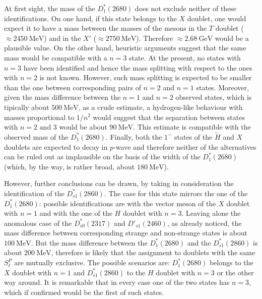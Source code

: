 At first sight, the mass of the $D^*_1(2680)$ does not exclude neither of these identifications. On one hand, if this state belongs to the $X$ doublet, one would expect it to have a mass between the masses of the mesons in the $T$ doublet ($\approx 2450 \ \text{MeV}$) and in the $X'$ ($\approx 2750 \ \text{MeV}$). Therefore $\approx 2.68 \ \text{GeV}$ would be a plausible value. On the other hand, heuristic arguments suggest that the same mass would be compatible with a $n = 3$ state. At the present, no states with $n = 3$ have been identified and hence the mass splitting with respect to the ones with $n = 2$ is not known. However, such mass splitting is expected to be smaller than the one between corresponding pairs of $n = 2$ and $n = 1$ states. Moreover, given the mass difference between the $n = 1$ and $n = 2$ observed states, which is tipically about $500 \ \text{MeV}$, as a crude estimate, a hydrogen-like behaviour with masses proportional to $1/n^2$ would suggest that the separation between states with $n = 2 \text{ and } 3$ would be about $90 \ \text{MeV}$. This estimate is compatible with the observed mass of the $D_1^*(2680)$. Finally, both the $1^-$ states of the $\tilde{H}$ and $X$ doublets are expected to decay in $p$-wave and therefore neither of the alternatives can be ruled out as implausible on the basis of the width of the $D^*_1(2680)$ (which, by the way, is rather broad, about $180 \ \text{MeV}$).

However, further conclusions can be drawn, by taking in consideration the identification of the $D^*_{s 1}(2860)$. The case for this state mirrors the one of the $D^*_1(2680)$: possible identifications are with the vector meson of the $X$ doublet with $n = 1$ and with the one of the $H$ doublet with $n = 3$. Leaving alone the anomalous case of the $D^*_{s 0}(2317)$ and $D'_{s 1}(2460)$, as already noticed, the mass difference between corresponding strange and non-strange states is about $100 \ \text{MeV}$. But the mass difference between the $D_1^*(2680)$ and the $D^*_{s 1}(2860)$ is about $200 \ \text{MeV}$, therefore is likely that the assignment to doublets with the same $S^P_\ell$ are mutually exclusive. The possible scenarios are: $D^*_1(2680)$ belongs to the $X$ doublet with $n = 1$ and $D^*_{s 1}(2860)$ to the $H$ doublet with $n = 3$ or the other way around. It is remarkable that in every case one of the two states has $n = 3$, which if confirmed would be the first of such states.

